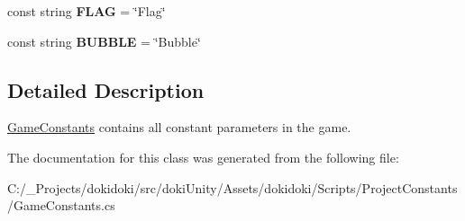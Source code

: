 \begin{DoxyCompactItemize}
\item 
const string {\bfseries F\+L\+AG} = \char`\"{}Flag\char`\"{}\hypertarget{classdoki_unity_1_1_game_constants_aca0c97a32c97be62d4e1bc09ca51bd96}{}\label{classdoki_unity_1_1_game_constants_aca0c97a32c97be62d4e1bc09ca51bd96}

\item 
const string {\bfseries B\+U\+B\+B\+LE} = \char`\"{}Bubble\char`\"{}\hypertarget{classdoki_unity_1_1_game_constants_ab9ae9b1db62e5f186b43864922e4d08c}{}\label{classdoki_unity_1_1_game_constants_ab9ae9b1db62e5f186b43864922e4d08c}

\end{DoxyCompactItemize}


\subsection{Detailed Description}
\hyperlink{classdoki_unity_1_1_game_constants}{Game\+Constants} contains all constant parameters in the game. 



The documentation for this class was generated from the following file\+:\begin{DoxyCompactItemize}
\item 
C\+:/\+\_\+\+Projects/dokidoki/src/doki\+Unity/\+Assets/dokidoki/\+Scripts/\+Project\+Constants/Game\+Constants.\+cs\end{DoxyCompactItemize}
